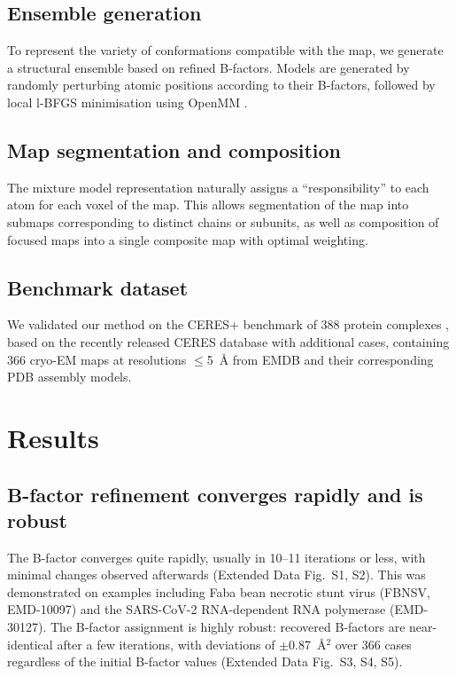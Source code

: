 \documentclass[11pt]{article}
\begin{document}
\subsection{Ensemble generation}

To represent the variety of conformations compatible with the map, we generate a structural ensemble based on refined B-factors. Models are generated by randomly perturbing atomic positions according to their B-factors, followed by local l-BFGS minimisation \citep{liu1989} using OpenMM \citep{eastman2017}.

\subsection{Map segmentation and composition}

The mixture model representation naturally assigns a ``responsibility'' to each atom for each voxel of the map. This allows segmentation of the map into submaps corresponding to distinct chains or subunits, as well as composition of focused maps into a single composite map with optimal weighting.

\subsection{Benchmark dataset}

We validated our method on the CERES+ benchmark of 388 protein complexes \citep{ceres2021}, based on the recently released CERES database with additional cases, containing 366 cryo-EM maps at resolutions $\leq$5~\AA{} from EMDB and their corresponding PDB assembly models.

\section{Results}

\subsection{B-factor refinement converges rapidly and is robust}

The B-factor converges quite rapidly, usually in 10--11 iterations or less, with minimal changes observed afterwards (Extended Data Fig.~S1, S2). This was demonstrated on examples including Faba bean necrotic stunt virus (FBNSV, EMD-10097) and the SARS-CoV-2 RNA-dependent RNA polymerase (EMD-30127). The B-factor assignment is highly robust: recovered B-factors are near-identical after a few iterations, with deviations of $\pm$0.87~\AA$^2$ over 366 cases regardless of the initial B-factor values (Extended Data Fig.~S3, S4, S5).
\end{document}
